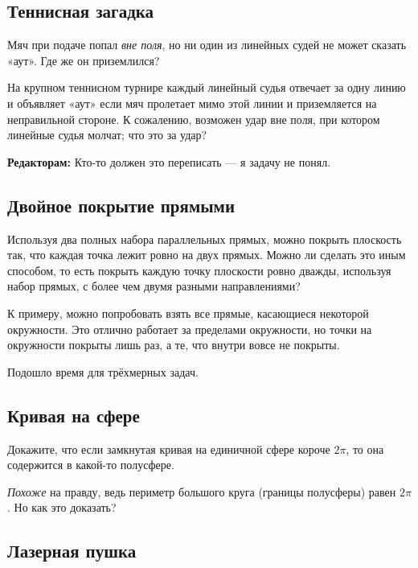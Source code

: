 \subsection*{Теннисная загадка}

Мяч при подаче попал \emph{вне поля}, но ни один из линейных судей не может сказать «аут».
Где же он приземлился?

На крупном теннисном турнире каждый линейный судья отвечает за одну линию и объявляет «аут» если мяч пролетает мимо этой линии и приземляется на неправильной стороне.
К сожалению, возможен удар вне поля, при котором линейные судья молчат; что это за удар?

\begin{addedbytheeditors}
\textbf{Редакторам:} Кто-то должен это переписать --- я задачу не понял.
\end{addedbytheeditors}


\subsection*{Двойное покрытие прямыми}

Используя два полных набора параллельных прямых, можно покрыть плоскость так, что каждая точка лежит ровно на двух прямых.
Можно ли сделать это иным способом, то есть покрыть каждую точку плоскости ровно дважды, используя набор прямых, с более чем двумя разными направлениями?

 К примеру, можно попробовать взять все прямые, касающиеся некоторой окружности.
Это отлично работает за пределами окружности, но точки на окружности покрыты лишь раз, а те, что внутри вовсе не покрыты.

\medskip

Подошло время для трёхмерных задач.

\subsection*{Кривая на сфере}

Докажите, что если замкнутая кривая на единичной сфере короче $2\pi$, то она содержится в какой-то полусфере.

 \emph{Похоже} на правду, ведь периметр большого круга (границы полусферы) равен $2\pi$.
Но как это доказать?

\subsection*{Лазерная пушка}

